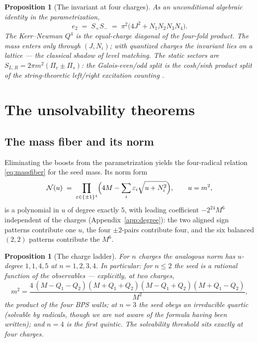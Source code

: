\documentclass[11pt]{article}
\newtheorem{proposition}[theorem]{Proposition}
\theoremstyle{definition}
\theoremstyle{remark}
\begin{document}
\begin{proposition}[The invariant at four charges]
\label{prop:crown}
As an unconditional algebraic identity in the parametrization,
\begin{equation}
e_2 \;=\; S_+S_- \;=\; \pi^2\bigl(4J^2 + N_1N_2N_3N_4\bigr).
\end{equation}
The Kerr--Newman $Q^4$ is the equal-charge diagonal of the four-fold product.
The mass enters only through $(J,N_i)$; with quantized charges the invariant
lies on a lattice --- the classical shadow of level matching. The static
sectors are $S_{L,R}=2\pi m^2(\Pi_c\pm\Pi_s)$: the Galois-even/odd split is the
cosh/sinh product split of the string-theoretic left/right excitation counting
\cite{CL1,SV}.
\end{proposition}

\section{The unsolvability theorems}
\label{sec:unsolvable}

\subsection{The mass fiber and its norm}

Eliminating the boosts from the parametrization yields the four-radical
relation \eqref{eq:massfiber} for the seed mass. Its norm form
\begin{equation}
\mathcal N(u)\;=\;\prod_{\varepsilon\in\{\pm1\}^4}
\Bigl(4M-\sum_i \varepsilon_i\sqrt{u+N_i^2}\Bigr),
\qquad u=m^2,
\label{eq:norm}
\end{equation}
is a polynomial in $u$ of degree exactly $5$, with leading coefficient
$-2^{24}M^6$ independent of the charges (Appendix~\ref{app:degree}): the two
aligned sign patterns contribute one $u$, the four $\pm2$-pairs contribute
four, and the six balanced $(2,2)$ patterns contribute the $M^6$.

\begin{proposition}[The charge ladder]
\label{prop:ladder}
For $n$ charges the analogous norm has $u$-degree $1,1,4,5$ at
$n=1,2,3,4$. In particular: for $n\le2$ the seed is a rational function of the
observables --- explicitly, at two charges,
\begin{equation}
m^2=\frac{4\,(M-Q_1-Q_2)(M+Q_1+Q_2)(M-Q_1+Q_2)(M+Q_1-Q_2)}{M^2},
\end{equation}
the product of the four BPS walls; at $n=3$ the seed obeys an irreducible
quartic (solvable by radicals, though we are not aware of the formula having
been written); and $n=4$ is the first quintic. The solvability threshold sits
exactly at four charges.
\end{proposition}
\end{document}
